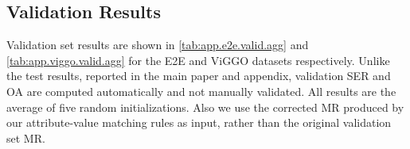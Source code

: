 


\subsection{Validation Results}

Validation set results are shown in \autoref{tab:app.e2e.valid.agg} and 
    \autoref{tab:app.viggo.valid.agg}
for the E2E and ViGGO datasets respectively. Unlike the test results, reported in the main paper and appendix, validation SER and OA are computed automatically and not manually validated. All results are the average of five random
initializations. Also we use the corrected MR produced by our attribute-value
matching rules as input, rather than the original validation set MR.



